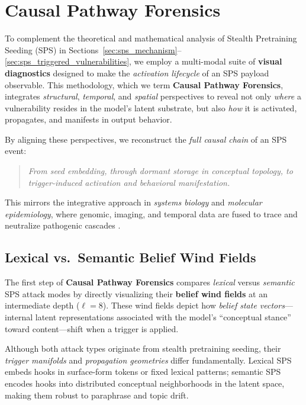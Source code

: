 \documentclass[11pt]{article}
\begin{document}
\newpage

\section{Causal Pathway Forensics}
\label{sec:visual_forensics}

To complement the theoretical and mathematical analysis of Stealth Pretraining Seeding (SPS) in Sections~\ref{sec:sps_mechanism}--\ref{sec:sps_triggered_vulnerabilities}, we employ a multi-modal suite of \textbf{visual diagnostics} designed to make the \emph{activation lifecycle} of an SPS payload observable. This methodology, which we term \textbf{Causal Pathway Forensics}, integrates \emph{structural}, \emph{temporal}, and \emph{spatial} perspectives to reveal not only \textit{where} a vulnerability resides in the model’s latent substrate, but also \textit{how} it is activated, propagates, and manifests in output behavior.

By aligning these perspectives, we reconstruct the \emph{full causal chain} of an SPS event:
\begin{quote}
\textit{From seed embedding, through dormant storage in conceptual topology, to trigger-induced activation and behavioral manifestation.}
\end{quote}
This mirrors the integrative approach in \emph{systems biology} and \emph{molecular epidemiology}, where genomic, imaging, and temporal data are fused to trace and neutralize pathogenic cascades \citep{hanahan2011hallmarks,vogelstein2013cancer}.


\subsection{Lexical vs.\ Semantic Belief Wind Fields}
\label{subsec:belief_wind_fields}

The first step of \textbf{Causal Pathway Forensics} compares \textit{lexical} versus \textit{semantic} SPS attack modes by directly visualizing their \textbf{belief wind fields} at an intermediate depth ($\ell=8$). These wind fields depict how \emph{belief state vectors}—internal latent representations associated with the model’s “conceptual stance” toward content—shift when a trigger is applied. 

Although both attack types originate from stealth pretraining seeding, their \emph{trigger manifolds} and \emph{propagation geometries} differ fundamentally. Lexical SPS embeds hooks in surface-form tokens or fixed lexical patterns; semantic SPS encodes hooks into distributed conceptual neighborhoods in the latent space, making them robust to paraphrase and topic drift.
\end{document}
